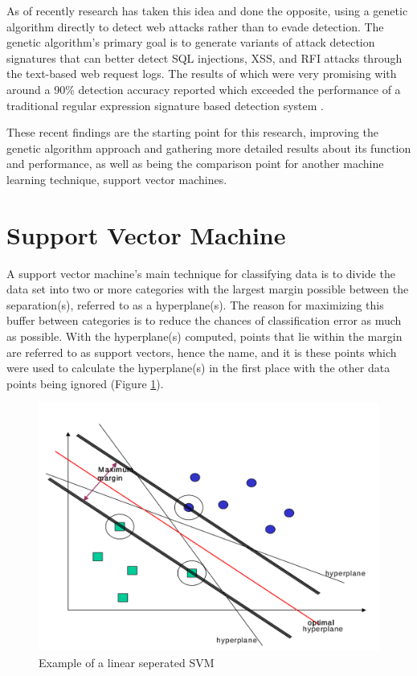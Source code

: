 As of recently research has taken this idea and done the opposite, using a genetic algorithm directly to detect web attacks rather than to evade detection.  The genetic algorithm’s primary goal is to generate variants of attack detection signatures that can better detect SQL injections, XSS, and RFI attacks through the text-based web request logs.  The results of which were very promising with around a 90\% detection accuracy reported which exceeded the performance of a traditional regular expression signature based detection system \cite{mainPaper}.

These recent findings are the starting point for this research, improving the genetic algorithm approach and gathering more detailed results about its function and performance, as well as being the comparison point for another machine learning technique, support vector machines.

\section{Support Vector Machine} \label{sec:SVM}

A support vector machine's main technique for classifying data is to divide the data set into two or more categories with the largest margin possible between the separation(s), referred to as a hyperplane(s).  The reason for maximizing this buffer between categories is to reduce the chances of classification error as much as possible.  With the hyperplane(s) computed, points that lie within the margin are referred to as support vectors, hence the name, and it is these points which were used to calculate the hyperplane(s) in the first place with the other data points being ignored (Figure \ref{fig:svmmargin}).

\begin{figure}
	\includegraphics[width=450px]{./assets/img/svmmargin.png}
	\caption{Example of a linear seperated SVM \cite{supervisedMachineLearning}}
	\label{fig:svmmargin}
\end{figure}

